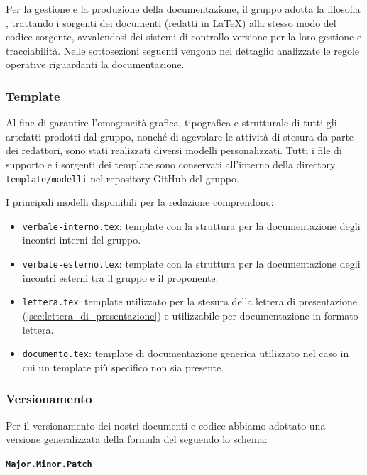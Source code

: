 \documentclass[documento]{gpt}
\begin{document}
	Per la gestione e la produzione della documentazione, il gruppo adotta la filosofia , trattando i sorgenti dei documenti (redatti in LaTeX) alla stesso modo del codice sorgente, avvalendosi dei sistemi di controllo versione  per la loro gestione e tracciabilità. Nelle sottosezioni seguenti vengono nel dettaglio analizzate le regole operative riguardanti la documentazione.
	
	\subsubsection{Template}
	Al fine di garantire l'omogeneità grafica, tipografica e strutturale di tutti gli artefatti prodotti dal gruppo, nonché di agevolare le attività di stesura da parte dei redattori, sono stati realizzati diversi modelli personalizzati. Tutti i file di supporto e i sorgenti dei template sono conservati all'interno della directory \texttt{template/modelli} nel repository GitHub del gruppo.
	
	I principali modelli disponibili per la redazione comprendono:
	
	\begin{itemize}
		\item \texttt{verbale-interno.tex}: template con la struttura per la documentazione degli incontri interni del gruppo.
		\item \texttt{verbale-esterno.tex}: template con la struttura per la documentazione degli incontri esterni tra il gruppo e il proponente.
		\item \texttt{lettera.tex}: template utilizzato per la stesura della lettera di presentazione (\autoref{sec:lettera_di_presentazione}) e utilizzabile per documentazione in formato lettera.
		\item \texttt{documento.tex}: template di documentazione generica utilizzato nel caso in cui un template più specifico non sia presente.
	\end{itemize}
	
	\subsubsection{Versionamento}\label{sec:versionamento}
	Per il versionamento dei nostri documenti e codice abbiamo adottato una versione generalizzata della formula del  seguendo lo schema:
	\begin{center}
		\Large \texttt{\textbf{Major.Minor.Patch}}
	\end{center}
	
\end{document}
